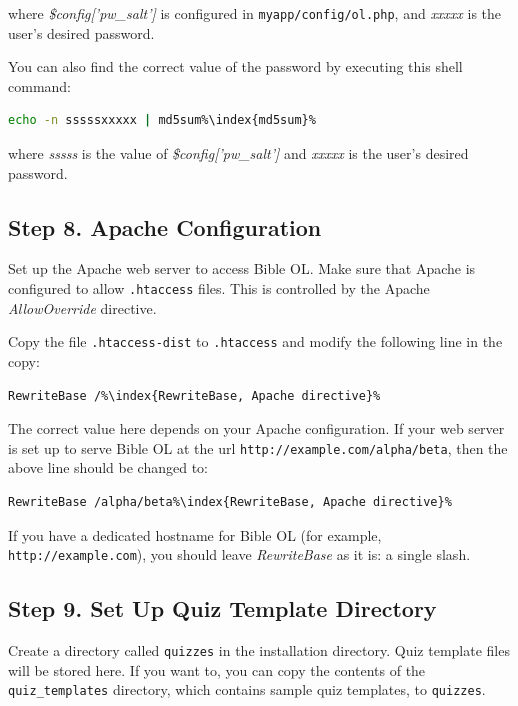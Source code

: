 \documentclass[11pt,oneside,a4paper]{memoir}
\newcommand{\q}{{\mainnolig '}}
\begin{document}
\noindent
where \emph{\$config[\q pw\_salt\q]} is configured in \texttt{myapp/config/ol.php}, and
\emph{xxxxx} is the user's desired password.

You can also find the correct value of the password by executing this shell command:

\begin{lstlisting}[language=bash]
echo -n sssssxxxxx | md5sum%\index{md5sum}%
\end{lstlisting}

\noindent
where \emph{sssss} is the value of \emph{\$config[\q pw\_salt\q]} and \emph{xxxxx} is the user's
desired password.


\subsection{Step 8. Apache Configuration}

Set up the Apache web server to access Bible OL. Make sure that Apache is configured to allow
\texttt{.htaccess} files. This is controlled by the Apache
\emph{AllowOverride} directive.

Copy the file \texttt{.htaccess-dist} to \texttt{.htaccess} and modify the following line in the
copy:

\begin{lstlisting}
RewriteBase /%\index{RewriteBase, Apache directive}%
\end{lstlisting}

The correct value here depends on your Apache configuration. If your web server is set up to serve
Bible OL at the url \texttt{http://example.com/alpha/beta}, then the above line should be changed to:

\begin{lstlisting}
RewriteBase /alpha/beta%\index{RewriteBase, Apache directive}%
\end{lstlisting}

If you have a dedicated hostname for Bible OL (for example, \texttt{http://example.com}), you should
leave \emph{RewriteBase} as it is: a single slash.

\subsection{Step 9. Set Up Quiz Template Directory}

Create a directory called \texttt{quizzes} in the installation directory. Quiz template files will
be stored here. If you want to, you can copy the contents of the \texttt{quiz\_templates} directory,
which contains sample quiz templates, to \texttt{quizzes}.
\end{document}
